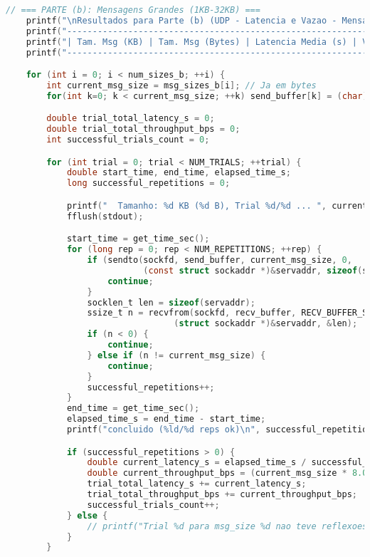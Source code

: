 \begin{lstlisting}[language=C, caption={Código fonte do Testador UDP (tester\_udp.c)}, label={lst:tester_udp}]
    // === PARTE (b): Mensagens Grandes (1KB-32KB) ===
    printf("\nResultados para Parte (b) (UDP - Latencia e Vazao - Mensagens Grandes):\n");
    printf("-------------------------------------------------------------------\n");
    printf("| Tam. Msg (KB) | Tam. Msg (Bytes) | Latencia Media (s) | Vazao Media (bps) |\n");
    printf("-------------------------------------------------------------------\n");

    for (int i = 0; i < num_sizes_b; ++i) {
        int current_msg_size = msg_sizes_b[i]; // Ja em bytes
        for(int k=0; k < current_msg_size; ++k) send_buffer[k] = (char)('X' + (k % 26));

        double trial_total_latency_s = 0;
        double trial_total_throughput_bps = 0;
        int successful_trials_count = 0;

        for (int trial = 0; trial < NUM_TRIALS; ++trial) {
            double start_time, end_time, elapsed_time_s;
            long successful_repetitions = 0;

            printf("  Tamanho: %d KB (%d B), Trial %d/%d ... ", current_msg_size/1024, current_msg_size, trial + 1, NUM_TRIALS);
            fflush(stdout);

            start_time = get_time_sec();
            for (long rep = 0; rep < NUM_REPETITIONS; ++rep) {
                if (sendto(sockfd, send_buffer, current_msg_size, 0,
                           (const struct sockaddr *)&servaddr, sizeof(servaddr)) < 0) {
                    continue;
                }
                socklen_t len = sizeof(servaddr);
                ssize_t n = recvfrom(sockfd, recv_buffer, RECV_BUFFER_SIZE, 0,
                                 (struct sockaddr *)&servaddr, &len);
                if (n < 0) {
                    continue;
                } else if (n != current_msg_size) {
                    continue;
                }
                successful_repetitions++;
            }
            end_time = get_time_sec();
            elapsed_time_s = end_time - start_time;
            printf("concluido (%ld/%d reps ok)\n", successful_repetitions, NUM_REPETITIONS);

            if (successful_repetitions > 0) {
                double current_latency_s = elapsed_time_s / successful_repetitions;
                double current_throughput_bps = (current_msg_size * 8.0) / current_latency_s;
                trial_total_latency_s += current_latency_s;
                trial_total_throughput_bps += current_throughput_bps;
                successful_trials_count++;
            } else {
                // printf("Trial %d para msg_size %d nao teve reflexoes bem sucedidas.\n", trial + 1, current_msg_size);
            }
        }


\end{lstlisting}
